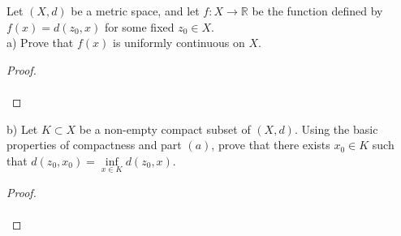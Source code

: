 Let $(X, d)$ be a metric space, and let $f: X \to \mathbb{R}$ be the function defined by \linebreak
$f(x) = d(z_0, x)$ for some fixed $z_0 \in X$. \\

a) Prove that $f(x)$ is uniformly continuous on $X$.

\begin{proof}\renewcommand{\qedsymbol}{}\ \\\\
\end{proof}

\pagebreak


b) Let $K \subset X$ be a non-empty compact subset of $(X, d)$. Using the basic properties of compactness and part 
   $(a)$, prove that there exists $x_0 \in K$ such that \linebreak
   $d(z_0, x_0) = \inf\limits_{x \in K}{d(z_0, x)}$.

\begin{proof}\renewcommand{\qedsymbol}{}\ \\\\
\end{proof}

\pagebreak